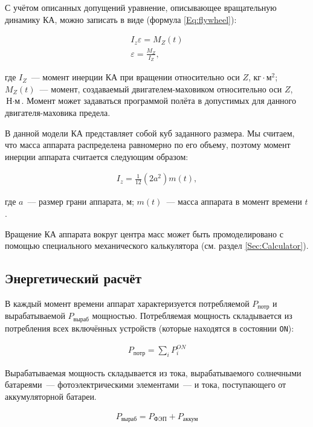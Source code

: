 \documentclass[12pt,a4paper]{article}
\begin{document}
С учётом описанных допущений уравнение, описывающее вращательную динамику КА, можно
записать в виде (формула \ref{Eq:flywheel}):

\begin{eqnarray}
  I_z \varepsilon = M_Z(t) \label{Eq:flywheel}\\
  \varepsilon = \frac{M_Z}{I_Z}, \label{Eq:angular-acceleration}
\end{eqnarray}

где $I_Z$~--- момент инерции КА при вращении относительно оси $Z$, $\text{кг} \cdot \text{м}^2$;
$M_Z(t)$~--- момент, создаваемый двигателем-маховиком относительно оси $Z$, $\text{Н}
\cdot \text{м}$. Момент может задаваться программой полёта в допустимых для данного
двигателя-маховика предела.

В данной модели КА представляет собой куб заданного размера. Мы считаем, что масса
аппарата распределена равномерно по его объему, поэтому момент инерции аппарата считается
следующим образом:

\begin{eqnarray}
  I_z = \frac{1}{12} (2 a^2) m(t), \label{Eq:inertia-moment}
\end{eqnarray}

где $a$~--– размер грани аппарата, м; $m(t)$~--- масса аппарата в момент времени $t$.

Вращение КА аппарата вокруг центра масс может быть промоделировано с помощью специального
механического калькулятора (см. раздел \ref{Sec:Calculator}).

\subsection{Энергетический расчёт}
\label{Sec:Energy}

В каждый момент времени аппарат характеризуется потребляемой $P_{\text{потр}}$ и
вырабатываемой $P_{\text{выраб}}$ мощностью. Потребляемая мощность складывается из
потребления всех включённых устройств (которые находятся в состоянии \verb'ON'):

\begin{eqnarray}
  P_{\text{потр}} = \sum_i{P_{i}^{ON}}
\end{eqnarray}

Вырабатываемая мощность складывается из тока, вырабатываемого солнечными батареями~--–
фотоэлектрическими элементами~--- и тока, поступающего от аккумуляторной батареи.

\begin{eqnarray}
  P_{\text{выраб}} = P_{\text{ФЭП}} + P_{\text{аккум}}
\end{eqnarray}
\end{document}
